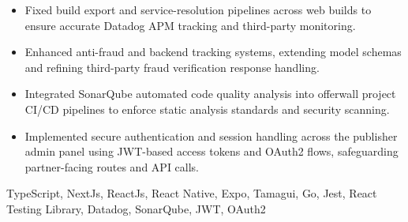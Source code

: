 \begin{projects}
{\begin{itemize}
        \item Fixed build export and service-resolution pipelines across web builds to ensure accurate Datadog APM tracking and third-party monitoring.
        \item Enhanced anti-fraud and backend tracking systems, extending model schemas and refining third-party fraud verification response handling.
        \item Integrated SonarQube automated code quality analysis into offerwall project CI/CD pipelines to enforce static analysis standards and security scanning.
        \item Implemented secure authentication and session handling across the publisher admin panel using JWT-based access tokens and OAuth2 flows, safeguarding partner-facing routes and API calls.
    \end{itemize}}
    {TypeScript, NextJs, ReactJs, React Native, Expo, Tamagui, Go, Jest, React Testing Library, Datadog, SonarQube, JWT, OAuth2}


\end{projects}
